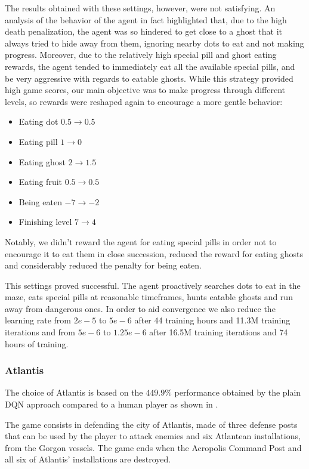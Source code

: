 \documentclass[10pt,twocolumn,letterpaper]{article}
\begin{document}
The results obtained with these settings, however, were not satisfying. An analysis of the behavior of the agent in fact highlighted that, due to the high death penalization, the agent was so hindered to get close to a ghost that it always tried to hide away from them, ignoring nearby dots to eat and not making progress. Moreover, due to the relatively high special pill and ghost eating rewards, the agent tended to immediately eat all the available special pills, and be very aggressive with regards to eatable ghosts. While this strategy provided high game scores, our main objective was to make progress through different levels, so rewards were reshaped again to encourage a more gentle behavior:
\begin{itemize}
	\item Eating dot $0.5 \rightarrow 0.5$
	\item Eating pill $1 \rightarrow 0$
	\item Eating ghost $2 \rightarrow 1.5$
	\item Eating fruit $0.5 \rightarrow 0.5$
	\item Being eaten $-7 \rightarrow -2$
	\item Finishing level $7 \rightarrow 4$
\end{itemize}

Notably, we didn't reward the agent for eating special pills in order not to encourage it to eat them in close succession, reduced the reward for eating ghosts and considerably reduced the penalty for being eaten.

This settings proved successful. The agent proactively searches dots to eat in the maze, eats special pills at reasonable timeframes, hunts eatable ghosts and run away from dangerous ones.
In order to aid convergence we also reduce the learning rate from $2e-5$ to $5e-6$ after 44 training hours and 11.3M training iterations and from $5e-6$ to $1.25e-6$ after 16.5M training iterations and 74 hours of training.

\subsubsection{Atlantis}
\label{atlantis}
The choice of Atlantis is based on the $449.9\%$ performance obtained by the plain DQN approach compared to a human player as shown in \cite{humancontrol}.
 
The game consists in defending the city of Atlantis, made of three defense posts that can be used by the player to attack enemies and six Atlantean installations, from the Gorgon vessels. The game ends when the Acropolis Command Post and all six of Atlantis' installations are destroyed. 
\end{document}
